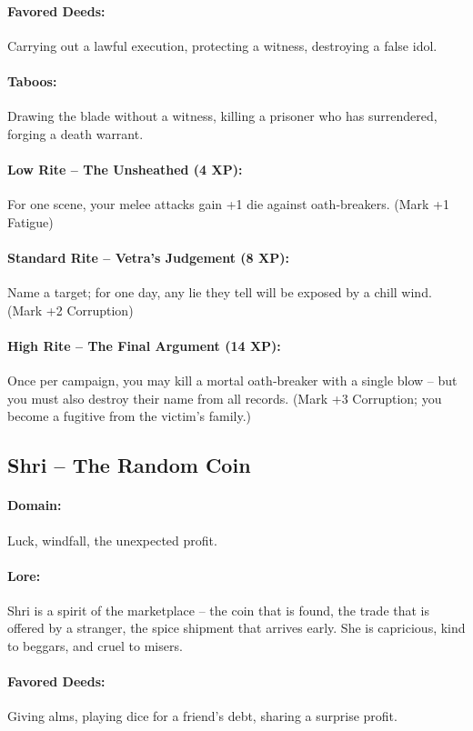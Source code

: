 \documentclass[11pt]{book}
\begin{document}
\paragraph{Favored Deeds:} Carrying out a lawful execution, protecting a witness, destroying a false idol.
\paragraph{Taboos:} Drawing the blade without a witness, killing a prisoner who has surrendered, forging a death warrant.
\paragraph{Low Rite -- The Unsheathed (4 XP):} For one scene, your melee attacks gain +1 die against oath‑breakers. (Mark +1 Fatigue)
\paragraph{Standard Rite -- Vetra's Judgement (8 XP):} Name a target; for one day, any lie they tell will be exposed by a chill wind. (Mark +2 Corruption)
\paragraph{High Rite -- The Final Argument (14 XP):} Once per campaign, you may kill a mortal oath‑breaker with a single blow -- but you must also destroy their name from all records. (Mark +3 Corruption; you become a fugitive from the victim's family.)

\subsection{Shri -- The Random Coin}
\paragraph{Domain:} Luck, windfall, the unexpected profit.
\paragraph{Lore:} Shri is a spirit of the marketplace -- the coin that is found, the trade that is offered by a stranger, the spice shipment that arrives early. She is capricious, kind to beggars, and cruel to misers.
\paragraph{Favored Deeds:} Giving alms, playing dice for a friend's debt, sharing a surprise profit.
\end{document}
